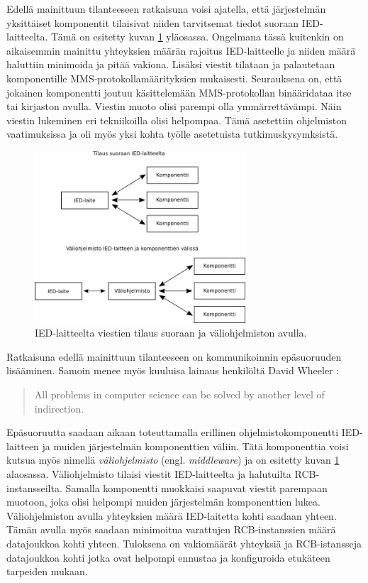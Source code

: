 Edellä mainittuun tilanteeseen ratkaisuna voisi ajatella, että järjestelmän yksittäiset komponentit tilaisivat niiden tarvitsemat tiedot suoraan IED-laitteelta. Tämä on esitetty kuvan \ref{fig:architecture-analysis} yläosassa. Ongelmana tässä kuitenkin on aikaisemmin mainittu yhteyksien määrän rajoitus IED-laitteelle ja niiden määrä haluttiin minimoida ja pitää vakiona. Lisäksi viestit tilataan ja palautetaan komponentille MMS-protokollamäärityksien mukaisesti. Seurauksena on, että jokainen komponentti joutuu käsittelemään MMS-protokollan binääridataa itse tai kirjaston avulla. Viestin muoto olisi parempi olla ymmärrettävämpi. Näin viestin lukeminen eri tekniikoilla olisi helpompaa. Tämä asetettiin ohjelmiston vaatimuksissa ja oli myös yksi kohta työlle asetetuista tutkimuskysymksistä.

\begin{figure}[ht!]
	\includegraphics[width=0.7\textwidth]{pictures/architecture-analysis.png}
	\caption{IED-laitteelta viestien tilaus suoraan ja väliohjelmiston avulla.}
	\label{fig:architecture-analysis}
\end{figure}

Ratkaisuna edellä mainittuun tilanteeseen on kommunikoinnin epäsuoruuden lisääminen. Samoin menee myös kuuluisa lainaus henkilöltä David Wheeler \cite[s.~290]{beautiful-code}:
\begin{quote}
	All problems in computer science can be solved by another level of indirection.
\end{quote}
Epäsuoruutta saadaan aikaan toteuttamalla erillinen ohjelmistokomponentti IED-laitteen ja muiden järjestelmän komponenttien väliin. Tätä komponenttia voisi kutsua myös nimellä \emph{väliohjelmisto} (engl. \emph{middleware}) ja on esitetty kuvan \ref{fig:architecture-analysis} alaosassa. Väliohjelmisto tilaisi viestit IED-laitteelta ja halutuilta RCB-instansseilta. Samalla komponentti muokkaisi saapuvat viestit parempaan muotoon, joka olisi helpompi muiden järjestelmän komponenttien lukea. Väliohjelmiston avulla yhteyksien määrä IED-laitetta kohti saadaan yhteen. Tämän avulla myös saadaan minimoitua varattujen RCB-instanssien määrä datajoukkoa kohti yhteen. Tuloksena on vakiomäärät yhteyksiä ja RCB-istansseja datajoukkoa kohti jotka ovat helpompi ennustaa ja konfiguroida etukäteen tarpeiden mukaan.

